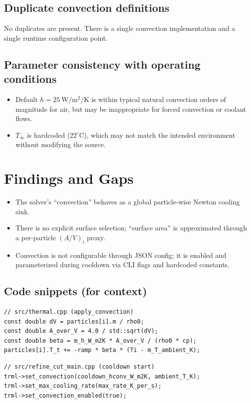\documentclass[11pt]{article}
\begin{document}
\subsection{Duplicate convection definitions}

No duplicates are present. There is a single convection implementation and a single runtime configuration point.

\subsection{Parameter consistency with operating conditions}

\begin{itemize}
  \item Default $h=25\ \mathrm{W/m^2/K}$ is within typical natural convection orders of magnitude for air, but may be inappropriate for forced convection or coolant flows.
  \item $T_\infty$ is hardcoded ($22^\circ\mathrm{C}$), which may not match the intended environment without modifying the source.
\end{itemize}

\section{Findings and Gaps}

\begin{itemize}
  \item The solver's ``convection'' behaves as a global particle-wise Newton cooling sink.
  \item There is no explicit surface selection; ``surface area'' is approximated through a per-particle $(A/V)_i$ proxy.
  \item Convection is not configurable through JSON config; it is enabled and parameterized during cooldown via CLI flags and hardcoded constants.
\end{itemize}

\subsection{Code snippets (for context)}

\begin{lstlisting}[style=cpp]
// src/thermal.cpp (apply_convection)
const double dV = particles[i].m / rho0;
const double A_over_V = 4.0 / std::sqrt(dV);
const double beta = m_h_W_m2K * A_over_V / (rho0 * cp);
particles[i].T_t += -ramp * beta * (Ti - m_T_ambient_K);
\end{lstlisting}

\begin{lstlisting}[style=cpp]
// src/refine_cut_main.cpp (cooldown start)
trml->set_convection(cooldown_hconv_W_m2K, ambient_T_K);
trml->set_max_cooling_rate(max_rate_K_per_s);
trml->set_convection_enabled(true);
\end{lstlisting}
\end{document}
